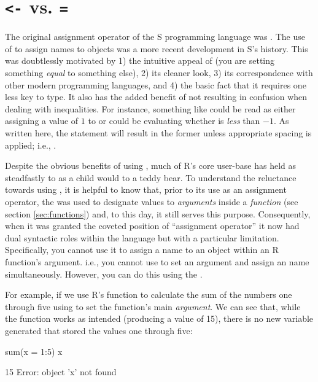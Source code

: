 \chapter{\texttt{<-} vs. \texttt{=}}
\label{sec:AppendixOperator}
The original assignment operator of the S programming language was \R{<-}. The use of \R{=} to assign names to objects was a more recent development in S's history. This was doubtlessly motivated by 1) the intuitive appeal of \R{=} (you are setting something \textit{equal} to something else), 2) its cleaner look, 3) its correspondence with other modern programming languages, and 4) the basic fact that it requires one less key to type. It also has the added benefit of not resulting in confusion when dealing with inequalities. For instance, something like  could be read as either assigning a value of $1$ to  or could be evaluating whether  is \textit{less} than $-1$.  As written here, the statement will result in the former unless appropriate spacing is applied; i.e., .  

Despite the obvious benefits of using \R{=}, much of R's core user-base has held as steadfastly to \R{<-} as a child would to a teddy bear. To understand the reluctance towards using \R{=}, it is helpful to know that, prior to its use as an assignment operator, the \R{=} was used to designate values to \textit{arguments} inside a \textit{function} (see section \ref{sec:functions}) and, to this day, it still serves this purpose. Consequently, when it was granted the coveted position of ``assignment operator'' it now had dual syntactic roles within the language but with a particular limitation.  Specifically, you cannot use it to assign a name to an object within an R function's argument. i.e., you cannot use \R{=} to set an argument and assign an name simultaneously. However, you can do this using the \R{<-}.

For example, if we use R's  function to calculate the sum of the numbers one through five using \R{=} to set the function's main \textit{argument}. We can see that, while the function works as intended (producing a value of 15), there is no new variable generated that stored the values one through five:

\clearpage

\begin{inR}
sum(x = 1:5)
x
\end{inR}

\begin{outR}
[1] 15
Error: object 'x' not found
\end{outR}

